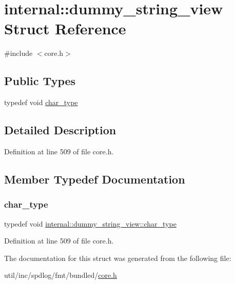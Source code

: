 \hypertarget{structinternal_1_1dummy__string__view}{}\section{internal\+:\+:dummy\+\_\+string\+\_\+view Struct Reference}
\label{structinternal_1_1dummy__string__view}


{\ttfamily \#include $<$core.\+h$>$}

\subsection*{Public Types}
\begin{DoxyCompactItemize}
\item 
typedef void \hyperlink{structinternal_1_1dummy__string__view_a22d91286a57f5494eabef1bbfc7e2bd0}{char\+\_\+type}
\end{DoxyCompactItemize}


\subsection{Detailed Description}


Definition at line 509 of file core.\+h.



\subsection{Member Typedef Documentation}
\mbox{\label{structinternal_1_1dummy__string__view_a22d91286a57f5494eabef1bbfc7e2bd0}} 
\subsubsection{\texorpdfstring{char\+\_\+type}{char\_type}}
{\footnotesize\ttfamily typedef void \hyperlink{structinternal_1_1dummy__string__view_a22d91286a57f5494eabef1bbfc7e2bd0}{internal\+::dummy\+\_\+string\+\_\+view\+::char\+\_\+type}}



Definition at line 509 of file core.\+h.



The documentation for this struct was generated from the following file\+:\begin{DoxyCompactItemize}
\item 
util/inc/spdlog/fmt/bundled/\hyperlink{core_8h}{core.\+h}\end{DoxyCompactItemize}
